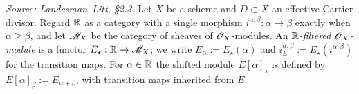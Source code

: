\begin{definition}
  \label{def:filtered-OX-module}
  \textit{Source: Landesman--Litt, \S2.3.}
  Let $X$ be a scheme and $D \subset X$ an effective Cartier divisor. Regard
  $\mathbb{R}$ as a category with a single morphism $i^{\alpha,\beta}:\alpha\to\beta$
  exactly when $\alpha \geq \beta$, and let $\mathscr{M}_X$ be the category of sheaves of
  $\mathscr{O}_X$-modules. An \emph{$\mathbb{R}$-filtered $\mathscr{O}_X$-module} is a functor
  $E_\star : \mathbb{R} \to \mathscr{M}_X$; we write $E_\alpha := E_\star(\alpha)$ and
  $i_E^{\alpha,\beta} := E_\star(i^{\alpha,\beta})$ for the transition maps.
  For $\alpha \in \mathbb{R}$ the shifted module $E[\alpha]_\star$ is defined by
  $E[\alpha]_\beta := E_{\alpha+\beta}$, with transition maps inherited from $E$.
\end{definition}

